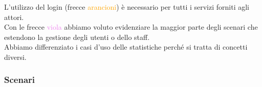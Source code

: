 \documentclass[a4paper]{article}
\begin{document}
L'utilizzo del login (frecce \textcolor{orange}{arancioni}) è necessario per tutti i servizi forniti agli attori.\\Con le frecce \textcolor{violet}{viola} abbiamo voluto evidenziare la maggior parte degli scenari che estendono la gestione degli utenti o dello staff.\\Abbiamo differenziato i casi d'uso delle statistiche perché si tratta di concetti diversi.    


\newpage

\subsubsection{Scenari}

\end{document}

